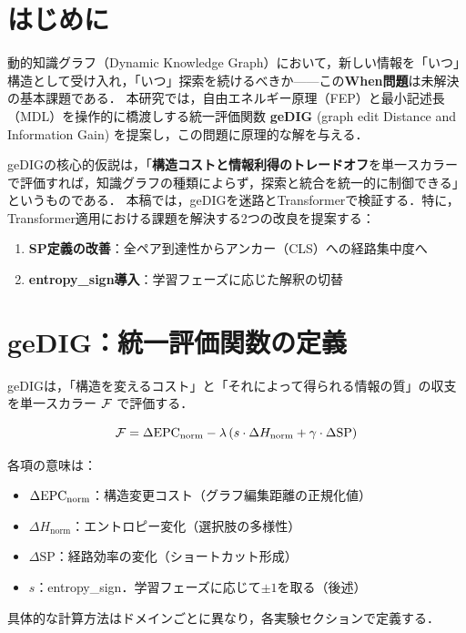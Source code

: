 \section{はじめに}

動的知識グラフ（Dynamic Knowledge Graph）において，新しい情報を「いつ」構造として受け入れ，「いつ」探索を続けるべきか——この\textbf{When問題}は未解決の基本課題である．
本研究では，自由エネルギー原理（FEP）\cite{friston2010}と最小記述長（MDL）\cite{grunwald2007}を操作的に橋渡しする統一評価関数 \textbf{geDIG} (graph edit Distance and Information Gain) を提案し，この問題に原理的な解を与える．

geDIGの核心的仮説は，「\textbf{構造コストと情報利得のトレードオフ}を単一スカラーで評価すれば，知識グラフの種類によらず，探索と統合を統一的に制御できる」というものである．
本稿では，geDIGを迷路とTransformerで検証する．特に，Transformer適用における課題を解決する2つの改良を提案する：
\begin{enumerate}
    \item \textbf{SP定義の改善}：全ペア到達性からアンカー（CLS）への経路集中度へ
    \item \textbf{entropy\_sign導入}：学習フェーズに応じた解釈の切替
\end{enumerate}

\section{geDIG：統一評価関数の定義}

geDIGは，「構造を変えるコスト」と「それによって得られる情報の質」の収支を単一スカラー $\mathcal{F}$ で評価する．

\begin{equation}
\mathcal{F} = \Delta\mathrm{EPC}_{\mathrm{norm}} - \lambda \left( s \cdot \Delta H_{\mathrm{norm}} + \gamma \cdot \Delta \mathrm{SP} \right)
\label{eq:gedig}
\end{equation}

各項の意味は：
\begin{itemize}
\item $\Delta\mathrm{EPC}_{\mathrm{norm}}$：構造変更コスト（グラフ編集距離の正規化値）
\item $\Delta H_{\mathrm{norm}}$：エントロピー変化（選択肢の多様性）
\item $\Delta \mathrm{SP}$：経路効率の変化（ショートカット形成）
\item $s$：entropy\_sign．学習フェーズに応じて$\pm 1$を取る（後述）
\end{itemize}
具体的な計算方法はドメインごとに異なり，各実験セクションで定義する．

